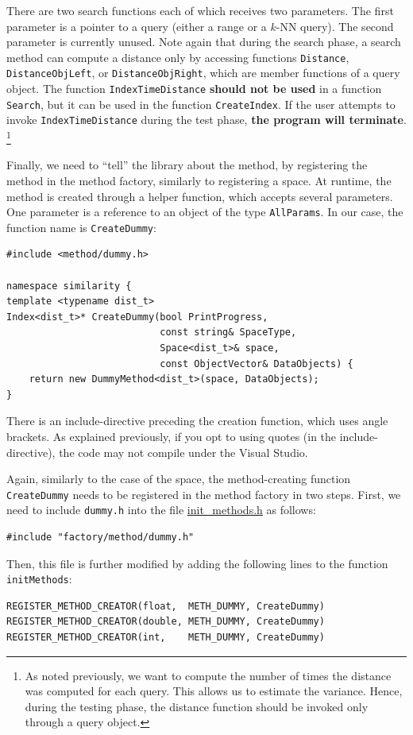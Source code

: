 \documentclass[runningheads,a4paper]{llncs}
\newcommand{\replocfile}{https://github.com/searchivarius/nmslib/blob/v1.5/}
\newcommand{\ttt}[1]{\texttt{#1}}
\newcommand{\knn}{$k$-NN }
\begin{document}
There are two search functions each of which receives two parameters.
The first parameter is a pointer to a query (either a range or a \knn query).
The second parameter is currently unused.
Note again that during the search phase, a search method can
compute a distance only by accessing functions \ttt{Distance}, \ttt{DistanceObjLeft}, or
\ttt{DistanceObjRight}, which are member functions of a query object.
The function \ttt{IndexTimeDistance} \textbf{should not be used} in a function \ttt{Search},
but it can be used in the function \ttt{CreateIndex}. 
If the user attempts to invoke \ttt{IndexTimeDistance} during the test phase,
\textbf{the program will terminate}.
\footnote{As noted previously, we want to compute the number of times
the distance was computed for each query. This allows us to estimate the variance.
Hence, during the testing phase, the distance function should be invoked only through
a query object.}


Finally, we need to ``tell'' the library about the method,
by registering the method in the method factory,
similarly to registering a space.
At runtime, the method is created through a helper function,
which accepts several parameters.
One parameter is a reference to an object of the type \ttt{AllParams}.
In our case, the function name is \ttt{CreateDummy}:

\begin{verbatim}
#include <method/dummy.h>

namespace similarity {
template <typename dist_t>
Index<dist_t>* CreateDummy(bool PrintProgress,
                           const string& SpaceType,
                           Space<dist_t>& space,
                           const ObjectVector& DataObjects) {
    return new DummyMethod<dist_t>(space, DataObjects);
}
\end{verbatim}
There is an include-directive preceding
the creation function, which uses angle brackets.
As explained previously, if you opt to using quotes (in the include-directive),
the code may not compile under the Visual Studio.

Again, similarly to the case of the space, 
the method-creating function \ttt{CreateDummy} needs
to be registered in the method factory in two steps.
First, we need to include \ttt{dummy.h} into the file
\href{\replocfile similarity_search/include/factory/init_methods.h}{init\_methods.h} as follows:
\begin{verbatim}
#include "factory/method/dummy.h"
\end{verbatim}
Then, this file is further modified by adding the following lines to the function \ttt{initMethods}:
\begin{verbatim}
REGISTER_METHOD_CREATOR(float,  METH_DUMMY, CreateDummy)
REGISTER_METHOD_CREATOR(double, METH_DUMMY, CreateDummy)
REGISTER_METHOD_CREATOR(int,    METH_DUMMY, CreateDummy)
\end{verbatim}
\end{document}
